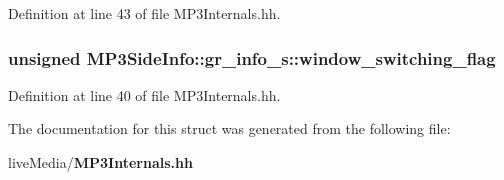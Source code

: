 Definition at line 43 of file M\+P3\+Internals.\+hh.

\subsubsection[{window\+\_\+switching\+\_\+flag}]{\setlength{\rightskip}{0pt plus 5cm}unsigned M\+P3\+Side\+Info\+::gr\+\_\+info\+\_\+s\+::window\+\_\+switching\+\_\+flag}\label{structMP3SideInfo_1_1gr__info__s_ad285e58bfee452595131df25a996c4cd}


Definition at line 40 of file M\+P3\+Internals.\+hh.



The documentation for this struct was generated from the following file\+:\begin{DoxyCompactItemize}
\item 
live\+Media/{\bf M\+P3\+Internals.\+hh}\end{DoxyCompactItemize}

